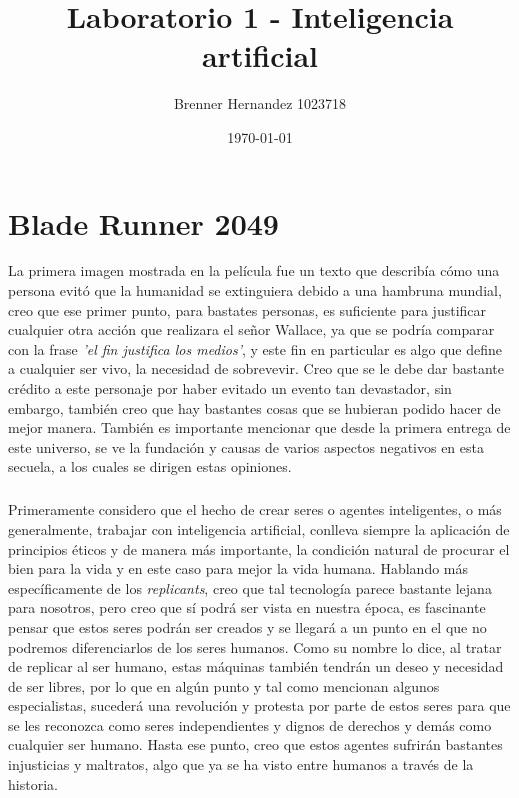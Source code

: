 \documentclass{scrreprt}
\title{Laboratorio 1 - Inteligencia artificial}
\author{Brenner Hernandez 1023718}
\date{\today}
\begin{document}
\maketitle

\chapter{Blade Runner 2049}

La primera imagen mostrada en la película fue un texto que describía cómo una persona evitó que la humanidad se extinguiera debido a una hambruna mundial, creo que ese primer punto, para bastates personas, es suficiente para justificar cualquier otra acción que realizara el señor Wallace, ya que se podría comparar con la frase \emph{'el fin justifica los medios'}, y este fin en particular es algo que define a cualquier ser vivo, la necesidad de sobrevevir. Creo que se le debe dar bastante crédito a este personaje por haber evitado un evento tan devastador, sin embargo, también creo que hay bastantes cosas que se hubieran podido hacer de mejor manera. También es importante mencionar que desde la primera entrega de este universo, se ve la fundación y causas de varios aspectos negativos en esta secuela, a los cuales se dirigen estas opiniones.

\paragraph{}Primeramente considero que el hecho de crear seres o agentes inteligentes, o más generalmente, trabajar con inteligencia artificial, conlleva siempre la aplicación de principios éticos y de manera más importante, la condición natural de procurar el bien para la vida y en este caso para mejor la vida humana. Hablando más específicamente de los \emph{replicants}, creo que tal tecnología parece bastante lejana para nosotros, pero creo que sí podrá ser vista en nuestra época, es fascinante pensar que estos seres podrán ser creados y se llegará a un punto en el que no podremos diferenciarlos de los seres humanos. Como su nombre lo dice, al tratar de replicar al ser humano, estas máquinas también tendrán un deseo y necesidad de ser libres, por lo que en algún punto y tal como mencionan algunos especialistas, sucederá una revolución y protesta por parte de estos seres para que se les reconozca como seres independientes y dignos de derechos y demás como cualquier ser humano. Hasta ese punto, creo que estos agentes sufrirán bastantes injusticias y maltratos, algo que ya se ha visto entre humanos a través de la historia. 
\end{document}

